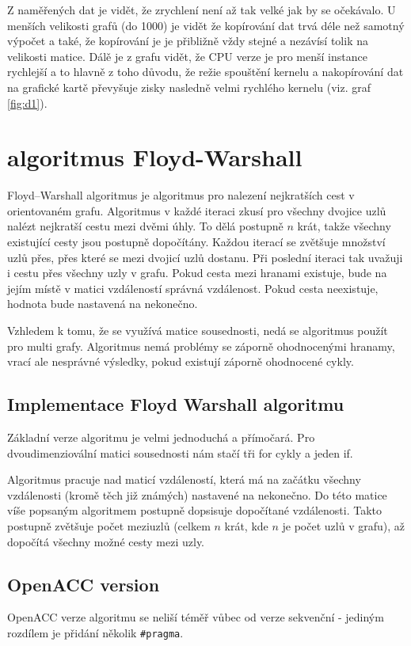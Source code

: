 \documentclass[11pt, fleqn]{article}
\begin{document}
Z naměřených dat je vidět, že zrychlení není až tak velké jak by se očekávalo. U menších velikosti grafů (do 1000) je vidět že kopírování dat trvá déle než samotný výpočet a také, že kopírování je je přibližně vždy stejné a nezávísí tolik na velikosti matice. Dálě je z grafu vidět, že CPU verze je pro menší instance rychlejší a to hlavně z toho důvodu, že režie spouštění kernelu a nakopírování dat na grafické kartě převyšuje zisky nasledně velmi rychlého kernelu (viz. graf \ref{fig:d1}).


\section{algoritmus Floyd-Warshall}

Floyd–Warshall algoritmus je algoritmus pro nalezení nejkratších cest v orientovaném grafu. Algoritmus v každé iteraci zkusí pro všechny dvojice uzlů nalézt nejkratší cestu mezi dvěmi úhly. To dělá postupně $n$ krát, takže všechny existující cesty jsou postupně dopočítány. Každou iterací se zvětšuje množství uzlů přes, přes které se mezi dvojicí uzlů dostanu. Při poslední iteraci tak uvažuji i cestu přes všechny uzly v grafu. Pokud cesta mezi hranami existuje, bude na jejím místě v matici vzdáleností správná vzdálenost. Pokud cesta neexistuje, hodnota bude nastavená na nekonečno.

Vzhledem k tomu, že se využívá matice sousednosti, nedá se algoritmus použít pro multi grafy. Algoritmus nemá problémy se záporně ohodnocenými hranamy, vrací ale nesprávné výsledky, pokud existují záporně ohodnocené cykly.


\subsection{Implementace Floyd Warshall algoritmu}
Základní verze algoritmu je velmi jednoduchá a přímočará. Pro dvoudimenziovální matici sousednosti nám stačí tři for cykly a jeden if.

Algoritmus pracuje nad maticí vzdáleností, která má na začátku všechny vzdálenosti (kromě těch již známých) nastavené na nekonečno. Do této matice víše popsaným algoritmem postupně dopsisuje dopočítané vzdálenosti. Takto postupně zvětšuje počet meziuzlů (celkem $n$ krát, kde $n$ je počet uzlů v grafu), až dopočítá všechny možné cesty mezi uzly.


\subsection{OpenACC version}
OpenACC verze algoritmu se neliší téměř vůbec od verze sekvenční - jediným rozdílem je přidání několik \lstinline{#pragma}.
\end{document}
